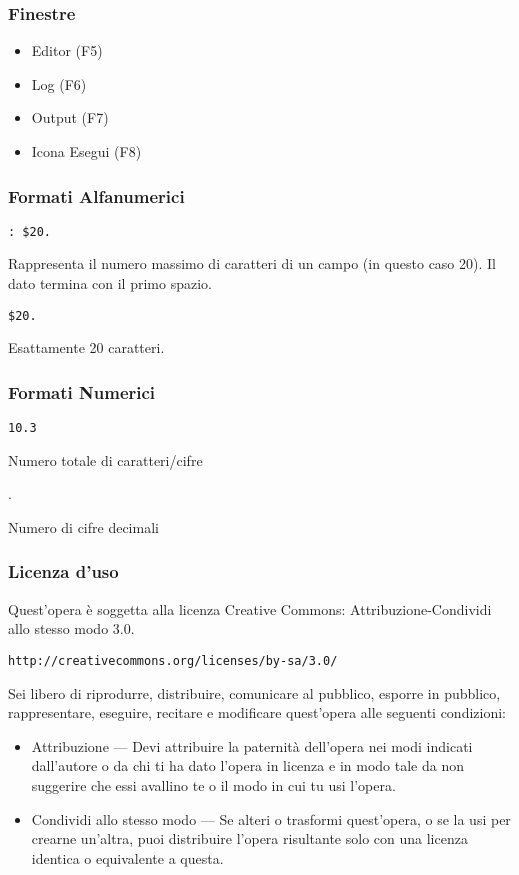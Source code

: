 \begin{frame}\frametitle{Finestre}
  \begin{itemize}
  \item
    Editor (F5)
  \item
    Log (F6)
  \item
    Output (F7)
  \item
    Icona Esegui (F8)
  \end{itemize}
\end{frame}



\begin{frame}[fragile]\frametitle{Formati Alfanumerici}
  \verb!: $20.!

  Rappresenta il numero massimo di caratteri di un campo (in questo caso
  20). Il dato termina con il primo spazio.

  \verb!$20.!

  Esattamente 20 caratteri.
\end{frame}

\begin{frame}[fragile]\frametitle{Formati Numerici}
  \verb!10.3!

  Numero totale di caratteri/cifre

  .

  Numero di cifre decimali
\end{frame}


\begin{frame}[containsverbatim]\frametitle{Licenza d'uso}
  \small

  Quest'opera {\`e} soggetta alla licenza Creative Commons: Attribuzione-Condividi
  allo stesso modo 3.0.

  \verb+http://creativecommons.org/licenses/by-sa/3.0/+

  Sei libero di riprodurre, distribuire, comunicare al pubblico, esporre in
  pubblico, rappresentare, eseguire, recitare e modificare quest'opera
  alle seguenti condizioni:
  \begin{itemize}
  \item
    Attribuzione — Devi attribuire la paternit{\`a} dell'opera nei modi indicati
    dall'autore o da chi ti ha dato l'opera in licenza e in modo tale da non
    suggerire che essi avallino te o il modo in cui tu usi l'opera.
  \item
    Condividi allo stesso modo — Se alteri o trasformi quest'opera, o se la usi
    per crearne un'altra, puoi distribuire l'opera risultante solo con una licenza
    identica o equivalente a  questa.
  \end{itemize}
  \vspace*{1cm}
\end{frame}






